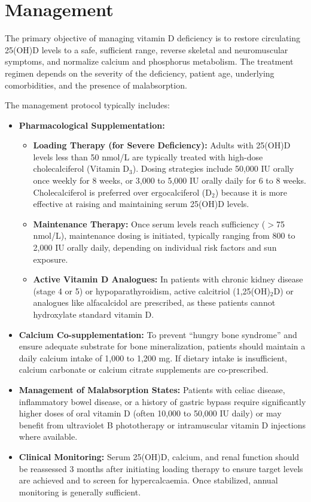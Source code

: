 \section*{Management}
The primary objective of managing vitamin D deficiency is to restore circulating 25(OH)D levels to a safe, sufficient range, reverse skeletal and neuromuscular symptoms, and normalize calcium and phosphorus metabolism. The treatment regimen depends on the severity of the deficiency, patient age, underlying comorbidities, and the presence of malabsorption.

The management protocol typically includes:
\begin{itemize}
    \item \textbf{Pharmacological Supplementation:}
    \begin{itemize}
        \item \textbf{Loading Therapy (for Severe Deficiency):} Adults with 25(OH)D levels less than 50 nmol/L are typically treated with high-dose cholecalciferol (Vitamin D$_{3}$). Dosing strategies include 50,000 IU orally once weekly for 8 weeks, or 3,000 to 5,000 IU orally daily for 6 to 8 weeks. Cholecalciferol is preferred over ergocalciferol (D$_{2}$) because it is more effective at raising and maintaining serum 25(OH)D levels.
        \item \textbf{Maintenance Therapy:} Once serum levels reach sufficiency ($>$75 nmol/L), maintenance dosing is initiated, typically ranging from 800 to 2,000 IU orally daily, depending on individual risk factors and sun exposure.
        \item \textbf{Active Vitamin D Analogues:} In patients with chronic kidney disease (stage 4 or 5) or hypoparathyroidism, active calcitriol (1,25(OH)$_{2}$D) or analogues like alfacalcidol are prescribed, as these patients cannot hydroxylate standard vitamin D.
    \end{itemize}
    \item \textbf{Calcium Co-supplementation:} To prevent ``hungry bone syndrome'' and ensure adequate substrate for bone mineralization, patients should maintain a daily calcium intake of 1,000 to 1,200 mg. If dietary intake is insufficient, calcium carbonate or calcium citrate supplements are co-prescribed.
    \item \textbf{Management of Malabsorption States:} Patients with celiac disease, inflammatory bowel disease, or a history of gastric bypass require significantly higher doses of oral vitamin D (often 10,000 to 50,000 IU daily) or may benefit from ultraviolet B phototherapy or intramuscular vitamin D injections where available.
    \item \textbf{Clinical Monitoring:} Serum 25(OH)D, calcium, and renal function should be reassessed 3 months after initiating loading therapy to ensure target levels are achieved and to screen for hypercalcaemia. Once stabilized, annual monitoring is generally sufficient.
\end{itemize}

